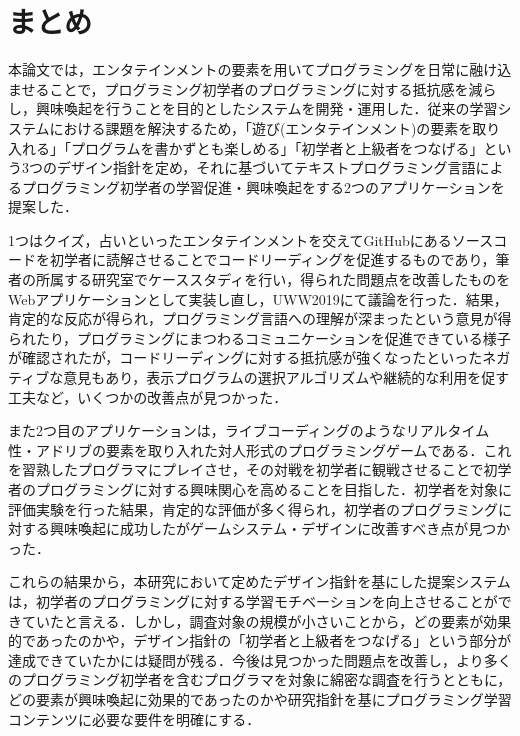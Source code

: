 \section{まとめ}

本論文では，エンタテインメントの要素を用いてプログラミングを日常に融け込ませることで，プログラミング初学者のプログラミングに対する抵抗感を減らし，興味喚起を行うことを目的としたシステムを開発・運用した．従来の学習システムにおける課題を解決するため，「遊び(エンタテインメント)の要素を取り入れる」「プログラムを書かずとも楽しめる」「初学者と上級者をつなげる」という3つのデザイン指針を定め，それに基づいてテキストプログラミング言語によるプログラミング初学者の学習促進・興味喚起をする2つのアプリケーションを提案した．

1つはクイズ，占いといったエンタテインメントを交えてGitHubにあるソースコードを初学者に読解させることでコードリーディングを促進するものであり，筆者の所属する研究室でケーススタディを行い，得られた問題点を改善したものをWebアプリケーションとして実装し直し，UWW2019にて議論を行った．結果，肯定的な反応が得られ，プログラミング言語への理解が深まったという意見が得られたり，プログラミングにまつわるコミュニケーションを促進できている様子が確認されたが，コードリーディングに対する抵抗感が強くなったといったネガティブな意見もあり，表示プログラムの選択アルゴリズムや継続的な利用を促す工夫など，いくつかの改善点が見つかった．

また2つ目のアプリケーションは，ライブコーディングのようなリアルタイム性・アドリブの要素を取り入れた対人形式のプログラミングゲームである．これを習熟したプログラマにプレイさせ，その対戦を初学者に観戦させることで初学者のプログラミングに対する興味関心を高めることを目指した．初学者を対象に評価実験を行った結果，肯定的な評価が多く得られ，初学者のプログラミングに対する興味喚起に成功したがゲームシステム・デザインに改善すべき点が見つかった．


これらの結果から，本研究において定めたデザイン指針を基にした提案システムは，初学者のプログラミングに対する学習モチベーションを向上させることができていたと言える．しかし，調査対象の規模が小さいことから，どの要素が効果的であったのかや，デザイン指針の「初学者と上級者をつなげる」という部分が達成できていたかには疑問が残る．今後は見つかった問題点を改善し，より多くのプログラミング初学者を含むプログラマを対象に綿密な調査を行うとともに，どの要素が興味喚起に効果的であったのかや研究指針を基にプログラミング学習コンテンツに必要な要件を明確にする．